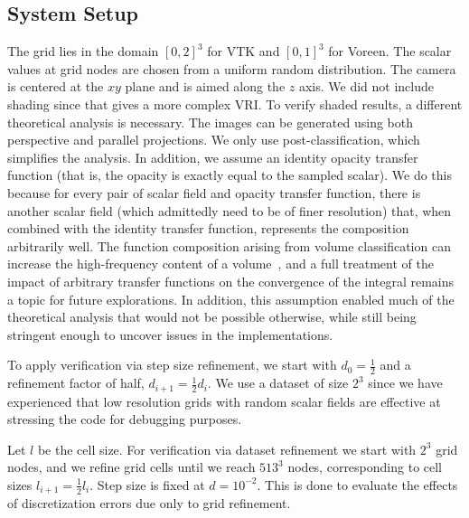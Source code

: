 \subsection{System Setup}

The grid lies in the domain $[0, 2]^3$ for VTK and $[0, 1]^3$ for
Voreen. The scalar values at grid nodes are chosen from a uniform
random distribution. The camera is centered at the $xy$ plane and is aimed 
along the $z$ axis. We did not include shading since that gives a
more complex VRI. To verify shaded results, a different
theoretical analysis is necessary.  The images can be generated using
both perspective and parallel projections. We only use
post-classification, which simplifies the analysis. In addition, we
assume an identity opacity transfer function (that is, the opacity is
exactly equal to the sampled scalar). We do this
because for every pair of scalar field and opacity transfer function,
there is another scalar field (which admittedly need to be of
finer resolution) that, when combined with the identity
transfer function, represents the composition arbitrarily well.
%
The function composition arising from volume classification 
can increase the high-frequency content of a
volume~\cite{Bergner:2006:ASA}, and a full treatment of the impact of
arbitrary transfer functions on the convergence of the integral
remains a topic for future explorations. In addition, this assumption
enabled much of the theoretical analysis that would not be 
possible otherwise, while still being stringent enough to uncover
issues in the implementations.

To apply verification via step size refinement, we start with $d_0 =
\frac{1}{2}$ and a refinement factor of half, $d_{i+1} = \frac{1}{2}
d_i$. We use a dataset of size $2^3$ since we have experienced that
low resolution grids with random scalar fields are effective at
stressing the code for debugging purposes.

Let $l$ be the cell size.
For verification via dataset refinement we start with $2^3$ grid
nodes, and we refine grid cells until we reach $513^3$ nodes,
corresponding to cell sizes $l_{i+1} = \frac{1}{2} l_i$. Step size is
fixed at $d = 10^{-2}$. This is done to evaluate the effects
of discretization errors due only to grid refinement.

